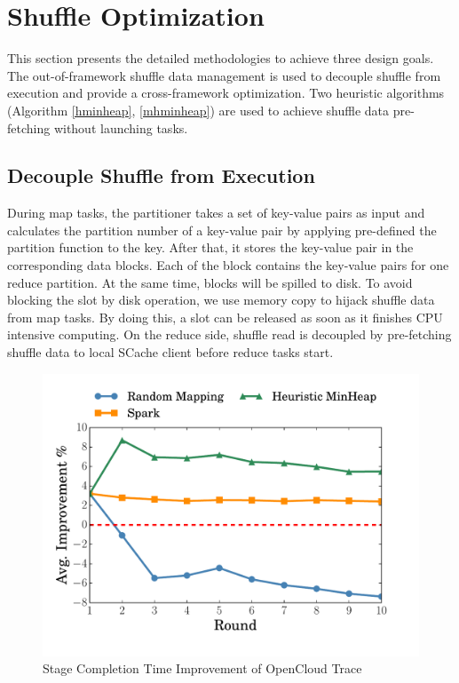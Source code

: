 \section{Shuffle Optimization}\label{opt}
This section presents the detailed methodologies to achieve three design goals. The out-of-framework shuffle data management is used to decouple shuffle from execution and provide a cross-framework optimization. Two heuristic algorithms (Algorithm \ref{hminheap}, \ref{mhminheap}) are used to achieve shuffle data pre-fetching without launching tasks.

\subsection{Decouple Shuffle from Execution}
During map tasks, the partitioner takes a set of key-value pairs as input and calculates the partition number of a key-value pair by applying pre-defined the partition function to the key. After that, it stores the key-value pair in the corresponding data blocks. Each of the block contains the key-value pairs for one reduce partition. At the same time, blocks will be spilled to disk. To avoid blocking the slot by disk operation, we use memory copy to hijack shuffle data from map tasks. By doing this, a slot can be released as soon as it finishes CPU intensive computing. 
On the reduce side, shuffle read is decoupled by pre-fetching shuffle data to local SCache client before reduce tasks start.

\begin{figure}
	\centering
	\includegraphics[width=0.75\linewidth]{fig/sim}
	\caption{Stage Completion Time Improvement of OpenCloud Trace}
	\label{fig:sim}
\end{figure}

